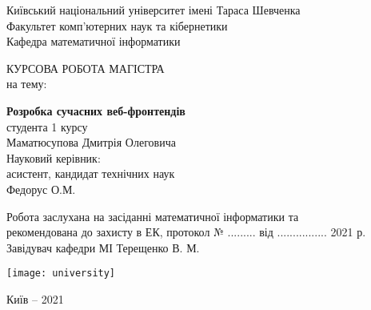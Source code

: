 \begin{titlepage}
    \begin{center}

        Київський національний університет імені Тараса Шевченка\\
        Факультет комп’ютерних наук та кібернетики\\
        Кафедра математичної інформатики\\

        \vspace*{5cm}

        КУРСОВА РОБОТА МАГІСТРА\\
        на тему:\\

        \vspace*{1cm}

        \textbf{Розробка сучасних веб-фронтендів}\\

        \vspace{1.5cm}
        \hspace{6cm}
        студента 1 курсу\\
        \hspace{6cm}
        Маматюсупова Дмитрія Олеговича\\

        \vspace{1.5cm}
        \hspace{6cm}
        Науковий керівник:\\
        \hspace{6cm}
        асистент, кандидат технічних наук\\
        \hspace{6cm}
        Федорус О.М.\\


        \vspace{3cm}

        Робота заслухана на засіданні математичної інформатики та\\
        рекомендована до захисту в ЕК, протокол № ......... від ................ 2021 р.\\

        \vspace{1cm}
        Завідувач кафедри МІ \hspace{5cm}   Терещенко В. М.

        \vspace{1cm}
        \vfill

        \vspace{0.8cm}

        \texttt{[image: university]}

        Київ -- 2021

    \end{center}
\end{titlepage}

